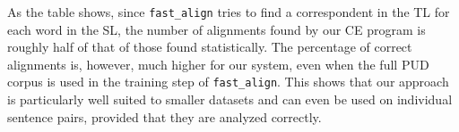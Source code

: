 As the table shows, since \texttt{fast\_align} tries to find a correspondent in the TL for each word in the SL, the number of alignments found by our CE program is roughly half of that of those found statistically. The percentage of correct alignments is, however, much higher for our system, even when the full PUD corpus is used in the training step of \texttt{fast\_align}. This shows that our approach is particularly well suited to smaller datasets and can even be used on individual sentence pairs, provided that they are analyzed correctly.